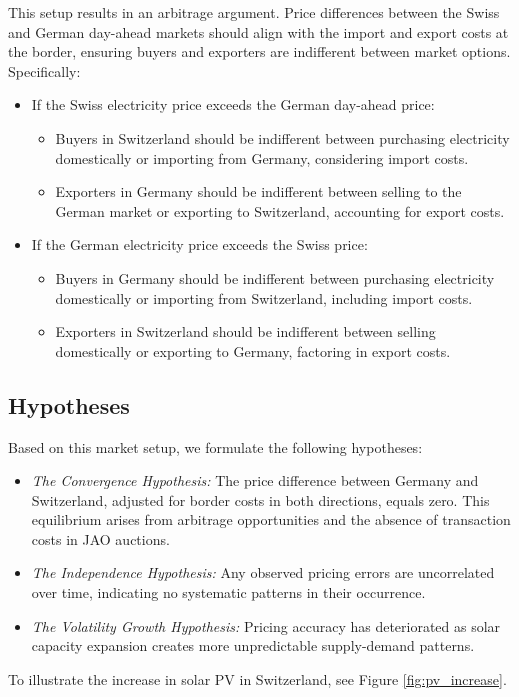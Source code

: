 \documentclass[12pt]{article}
\begin{document}
This setup results in an arbitrage argument. Price differences between the Swiss and German day-ahead markets should align with the import and export costs at the border, ensuring buyers and exporters are indifferent between market options. Specifically:
\begin{itemize}
    \item If the Swiss electricity price exceeds the German day-ahead price:
    \begin{itemize}
        \item Buyers in Switzerland should be indifferent between purchasing electricity domestically or importing from Germany, considering import costs.
        \item Exporters in Germany should be indifferent between selling to the German market or exporting to Switzerland, accounting for export costs.
    \end{itemize}
    \item If the German electricity price exceeds the Swiss price:
    \begin{itemize}
        \item Buyers in Germany should be indifferent between purchasing electricity domestically or importing from Switzerland, including import costs.
        \item Exporters in Switzerland should be indifferent between selling domestically or exporting to Germany, factoring in export costs.
    \end{itemize}
\end{itemize}


\subsection{Hypotheses}

Based on this market setup, we formulate the following hypotheses:

\begin{itemize}
    \item \textit{The Convergence Hypothesis:} The price difference between Germany and Switzerland, adjusted for border costs in both directions, equals zero. This equilibrium arises from arbitrage opportunities and the absence of transaction costs in JAO auctions.
    \item \textit{The Independence Hypothesis:} Any observed pricing errors are uncorrelated over time, indicating no systematic patterns in their occurrence.
    \item \textit{The Volatility Growth Hypothesis:} Pricing accuracy has deteriorated as solar capacity expansion creates more unpredictable supply-demand patterns.
\end{itemize}
To illustrate the increase in solar PV in Switzerland, see Figure \ref{fig:pv_increase}.
\end{document}
